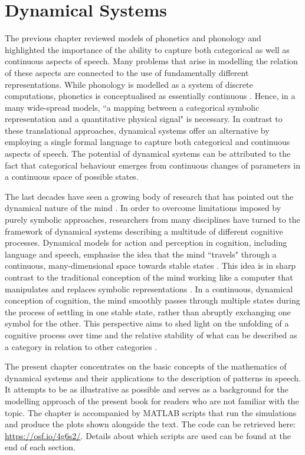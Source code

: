 \chapter{Dynamical Systems}
\label{chapter_ds}

The previous chapter reviewed models of phonetics and phonology and highlighted the importance of the ability to capture both categorical as well as continuous aspects of speech. Many problems that arise in modelling the relation of these aspects are connected to the use of fundamentally different representations. While phonology is modelled as a system of discrete computations, phonetics is conceptualised as essentially continuous \citep{Gafos2006}. Hence, in a many wide-spread models, ``a mapping between a categorical symbolic representation and a quantitative physical signal" \citep[8]{Ladd2006} is necessary. In contrast to these translational approaches, dynamical systems offer an alternative by employing a single formal language to capture both categorical and continuous aspects of speech. The potential of dynamical systems can be attributed to the fact that categorical behaviour emerges from continuous changes of parameters in a continuous space of possible states.

The last decades have seen a growing body of research that has pointed out the dynamical nature of the mind \citep[e.g.][]{Kelso1995,vanGelderPort1995,Port2002,Spivey2007,Kelso2013}. In order to overcome limitations imposed by purely symbolic approaches, researchers from many disciplines have turned to the framework of dynamical systems describing a multitude of different cognitive processes. Dynamical models for action and perception in cognition, including language and speech, emphasise the idea that the mind ``travels" through a continuous, many-dimensional space towards stable states \citep[4]{Spivey2007}. This idea is in sharp contrast to the traditional conception of the mind working like a computer that manipulates and replaces symbolic representations \citep{Fodor1975, FodorPylyshyn1981, Harnad1990, NewellSimon1976}. In a continuous, dynamical conception of cognition, the mind smoothly passes through multiple states during the process of settling in one stable state, rather than abruptly exchanging one symbol for the other. This perspective aims to shed light on the unfolding of a cognitive process over time and the relative stability of what can be described as a category in relation to other categories \citep{Port2002, GafosBenus2006, Spivey2007}. 

The present chapter concentrates on the basic concepts of the mathematics of dynamical systems and their applications to the description of patterns in speech. It attempts to be as illustrative as possible and serves as a background for the modelling approach of the present book for readers who are not familiar with the topic. The chapter is accompanied by MATLAB scripts that run the simulations and produce the plots shown alongside the text. The code can be retrieved here: \href{https://osf.io/4g6s2/}{https://osf.io/4g6s2/}. Details about which scripts are used can be found at the end of each section.

